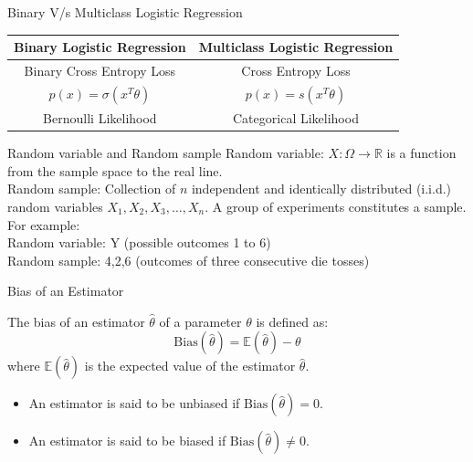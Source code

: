 \documentclass{beamer}
\begin{document}
\begin{frame}{Binary V/s Multiclass Logistic Regression}
\begin{center}
    \begin{tabular}{|c|c|}
    \hline
    \textbf{Binary Logistic Regression} & \textbf{Multiclass Logistic Regression} \\
    \hline
    Binary Cross Entropy Loss& Cross Entropy Loss \\
    \pause
    $p(x) = \sigma(x^T\theta)$ & $p(x) = s(x^T\theta)$ \\
    \pause
    Bernoulli Likelihood & Categorical Likelihood\\
    \hline
  \end{tabular}
\end{center}    
\end{frame}

    \begin{frame}{Random variable and Random sample}
    Random variable: $X:\Omega\rightarrow\mathbb{R}$ is a function from the sample space to the real line. \\ 
    \addlinespace
    \addlinespace
    Random sample: Collection of $n$ independent and identically distributed (i.i.d.) random variables $X_1, X_2, X_3, \ldots, X_n$. A group of experiments constitutes a sample.\\
    \addlinespace
    \addlinespace
    For example:\\
    Random variable: Y (possible outcomes 1 to 6)\\
    Random sample: {4,2,6} (outcomes of three consecutive die tosses)
    \end{frame}

    \begin{frame}{Bias of an Estimator}
        \begin{tcolorbox}[colback=metropolisblue!5,colframe=metropolisblue,title=Bias of an Estimator]
            The bias of an estimator $\hat{\theta}$ of a parameter $\theta$ is defined as:
            \[
                \text{Bias}(\hat{\theta}) = \mathbb{E}(\hat{\theta}) - \theta
            \]
            where $\mathbb{E}(\hat{\theta})$ is the expected value of the estimator $\hat{\theta}$.
        \end{tcolorbox}
        \begin{itemize}
            \item An estimator is said to be unbiased if $\text{Bias}(\hat{\theta}) = 0$.
            \item An estimator is said to be biased if $\text{Bias}(\hat{\theta}) \neq 0$.
        \end{itemize}
        
    \end{frame}
    
\end{document}
